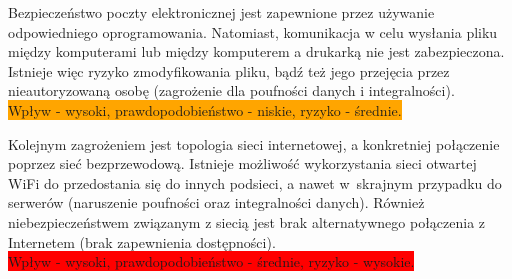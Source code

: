 Bezpieczeństwo poczty elektronicznej jest zapewnione przez używanie odpowiedniego oprogramowania. Natomiast, komunikacja w celu wysłania pliku między komputerami lub między komputerem a drukarką nie jest zabezpieczona. Istnieje więc ryzyko zmodyfikowania pliku, bądź też jego przejęcia przez nieautoryzowaną osobę  (zagrożenie dla poufności danych i integralności). \\   \colorbox{orange}{Wpływ - wysoki, prawdopodobieństwo - niskie, ryzyko - średnie.}  

Kolejnym zagrożeniem jest topologia sieci internetowej, a konkretniej połączenie poprzez sieć bezprzewodową. Istnieje możliwość wykorzystania sieci otwartej WiFi do przedostania się do innych podsieci, a nawet \linebreak w~skrajnym przypadku do serwerów (naruszenie poufności oraz integralności danych). Również niebezpieczeństwem \linebreak związanym z siecią jest brak alternatywnego połączenia z Internetem (brak zapewnienia dostępności). \\ \colorbox{red}{Wpływ - wysoki, prawdopodobieństwo - średnie, ryzyko - wysokie.}


% 
